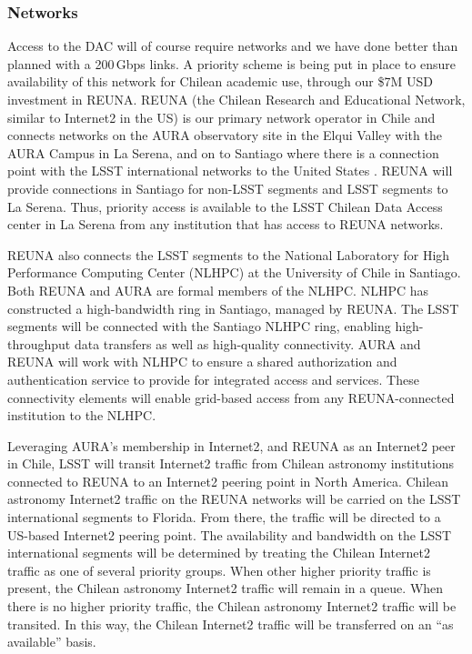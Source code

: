 \subsubsection{Networks}

Access to the DAC will of course require networks and we have done better than planned with a 200\,Gbps links.
A priority scheme is being put in place to ensure availability of this network  for Chilean academic use, through our \$7M USD investment in REUNA.
REUNA (the Chilean Research and Educational Network, similar to Internet2 in the US) is our primary network operator in Chile and connects networks on the AURA observatory site in the Elqui Valley with the AURA Campus in La Serena, and on to Santiago where there is a connection point with the LSST international networks to the United States .
REUNA will provide connections in Santiago for non-LSST segments and LSST segments to La Serena.
Thus, priority access is available to the LSST Chilean Data Access center in La Serena from any institution that has access to REUNA networks.

REUNA also connects the LSST segments to the National Laboratory for High Performance Computing Center (NLHPC) at the University of Chile in Santiago.
Both REUNA and AURA are formal members of the NLHPC.
NLHPC has constructed a high-bandwidth ring in Santiago, managed by REUNA.
The LSST segments will be connected with the Santiago NLHPC ring, enabling high-throughput data transfers as well as high-quality connectivity.
AURA and REUNA will work with NLHPC to ensure a shared authorization and authentication service to provide for integrated access and services.
These connectivity elements will enable grid-based access from any REUNA-connected institution to the NLHPC.

Leveraging AURA’s membership in Internet2, and REUNA as an Internet2 peer in Chile, LSST will transit Internet2 traffic from Chilean astronomy institutions connected to REUNA to an Internet2 peering point in North America.
Chilean astronomy Internet2 traffic on the REUNA networks will be carried on the LSST international segments to Florida.
From there, the traffic will be directed to a US-based Internet2 peering point.
The availability and bandwidth on the LSST international segments will be determined by treating the Chilean Internet2 traffic as one of several priority groups.
When other higher priority traffic is present, the Chilean astronomy Internet2 traffic will remain in a queue.
When there is no higher priority traffic, the Chilean astronomy Internet2 traffic will be transited.
In this way, the Chilean Internet2 traffic will be transferred on an ``as available'' basis.

